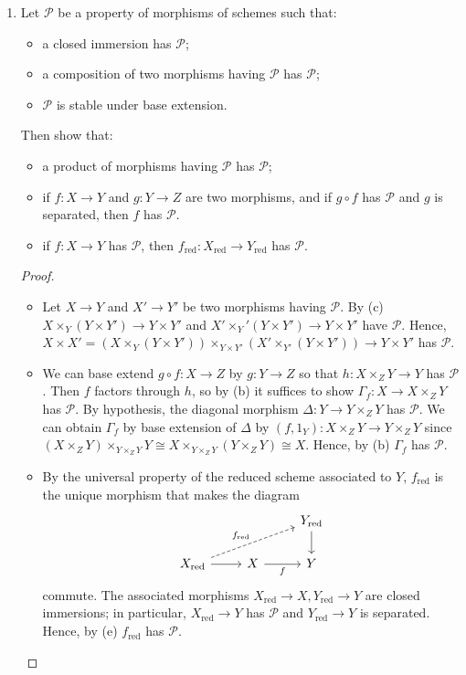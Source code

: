 \documentclass[a4paper]{article}
\begin{document}
\begin{enumerate} [label=\textbf{\arabic*.}, leftmargin=0em]
\item[\textbf{8.}] Let $\mathscr{P}$ be a property of morphisms of schemes such that:
\begin{itemize}
    \item[(a)] a closed immersion has $\mathscr{P}$;
    \item[(b)] a composition of two morphisms having $\mathscr{P}$ has $\mathscr{P}$;
    \item[(c)] $\mathscr{P}$ is stable under base extension.
\end{itemize}
Then show that:
\begin{itemize}
    \item[(d)] a product of morphisms having $\mathscr{P}$ has $\mathscr{P}$;
    \item[(e)] if $f : X \to Y$ and $g : Y \to Z$ are two morphisms, and if $g \circ f$ has $\mathscr{P}$ and $g$ is separated, then $f$ has $\mathscr{P}$.
    \item[(f)] if $f : X \to Y$ has $\mathscr{P}$, then $f_\text{red} : X_\text{red} \to Y_\text{red}$ has $\mathscr{P}$.
\end{itemize}

\begin{proof} $ $ \vspace{0pt}
   \begin{itemize}
    \item[(d)] Let $X \to Y$ and $X' \to Y'$ be two morphisms having $\mathscr{P}$. By (c) $X \times_Y (Y \times Y') \to Y \times Y'$ and $X' \times_Y' (Y \times Y') \to Y \times Y'$ have $\mathscr{P}$. Hence, $X \times X' = (X \times_Y (Y \times Y')) \times_{Y \times Y'} (X' \times_{Y'} (Y \times Y')) \to Y \times Y'$ has $\mathscr{P}$.

    \item[(e)] We can base extend $g \circ f : X \to Z$ by $g : Y \to Z$ so that $h : X \times_Z Y \to Y$ has $\mathscr{P}$. Then $f$ factors through $h$, so by (b) it suffices to show $\Gamma_f : X \to X \times_Z Y$ has $\mathscr{P}$. By hypothesis, the diagonal morphism $\Delta : Y \to Y \times_Z Y$ has $\mathscr{P}$. We can obtain $\Gamma_f$ by base extension of $\Delta$ by $(f, 1_Y) : X \times_Z Y \to Y \times_Z Y$ since $(X \times_Z Y) \times_{Y \times_Z Y} Y \cong X \times_{Y \times_Z Y} (Y \times_Z Y) \cong X$. Hence, by (b) $\Gamma_f$ has $\mathscr{P}$.

    \item[(f)] By the universal property of the reduced scheme associated to $Y$, $f_\text{red}$ is the unique morphism that makes the diagram
    \[\begin{tikzcd}
        &                   & Y_{\text{red}} \arrow[d] \\
    X_{\text{red}} \arrow[r] \arrow[rru, "f_\text{red}", dashed] & X \arrow[r, "f"'] & Y                       
    \end{tikzcd}\]
    commute. The associated morphisms $X_{\text{red}} \to X, Y_{\text{red}} \to Y$ are closed immersions; in particular, $X_\text{red} \to Y$ has $\mathscr{P}$ and $Y_{\text{red}} \to Y$ is separated. Hence, by (e) $f_{\text{red}}$ has $\mathscr{P}$.
   \end{itemize} 


\end{proof}
\end{enumerate}
\end{document}

